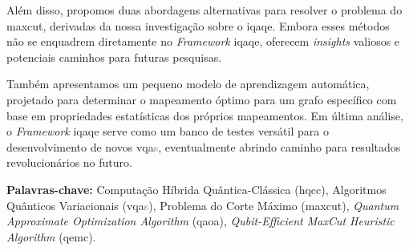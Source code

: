 Além disso, propomos duas abordagens alternativas para resolver o problema do \acrshort{maxcut}, derivadas da nossa investigação sobre o \acrshort{iqaqe}. Embora esses métodos não se enquadrem diretamente no \textit{Framework} \acrshort{iqaqe}, oferecem \textit{insights} valiosos e potenciais caminhos para futuras pesquisas.

Também apresentamos um pequeno modelo de aprendizagem automática, projetado para determinar o mapeamento óptimo para um grafo específico com base em propriedades estatísticas dos próprios mapeamentos. Em última análise, o \textit{Framework} \acrshort{iqaqe} serve como um banco de testes versátil para o desenvolvimento de novos \acrshort{vqa}\textcolor{gray}{s}, eventualmente abrindo caminho para resultados revolucionários no futuro.

\vfill

\textbf{\Large Palavras-chave:} Computação Híbrida Quântica-Clássica (\acrshort{hqcc}), Algoritmos Quânticos Variacionais (\acrshort{vqa}\textcolor{gray}{s}), Problema do Corte Máximo (\acrshort{maxcut}), \textit{Quantum Approximate Optimization Algorithm} (\acrshort{qaoa}), \textit{Qubit-Efficient MaxCut Heuristic Algorithm} (\acrshort{qemc}).

